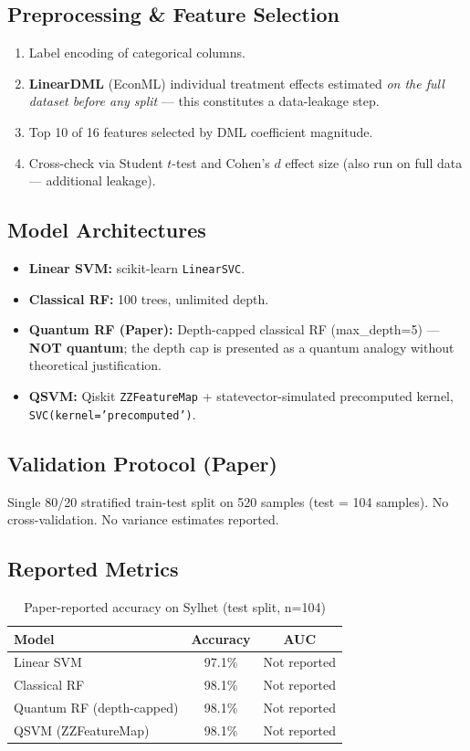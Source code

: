 \documentclass[12pt,a4paper]{article}
\begin{document}
\subsection{Preprocessing \& Feature Selection}
\begin{enumerate}[leftmargin=*]
  \item Label encoding of categorical columns.
  \item \textbf{LinearDML} (EconML) individual treatment effects estimated \emph{on the full dataset before any split} --- this constitutes a data-leakage step.
  \item Top 10 of 16 features selected by DML coefficient magnitude.
  \item Cross-check via Student $t$-test and Cohen's $d$ effect size (also run on full data --- additional leakage).
\end{enumerate}

\subsection{Model Architectures}
\begin{itemize}[leftmargin=*]
  \item \textbf{Linear SVM:} scikit-learn \texttt{LinearSVC}.
  \item \textbf{Classical RF:} 100 trees, unlimited depth.
  \item \textbf{Quantum RF (Paper):} Depth-capped classical RF (max\_depth=5) --- \textbf{NOT quantum}; the depth cap is presented as a quantum analogy without theoretical justification.
  \item \textbf{QSVM:} Qiskit \texttt{ZZFeatureMap} + statevector-simulated precomputed kernel, \texttt{SVC(kernel='precomputed')}.
\end{itemize}

\subsection{Validation Protocol (Paper)}
Single 80/20 stratified train-test split on 520 samples (test = 104 samples). No cross-validation. No variance estimates reported.

\subsection{Reported Metrics}
\begin{table}[h!]
  \centering
  \caption{Paper-reported accuracy on Sylhet (test split, n=104)}
  \begin{tabular}{lcc}
    \toprule
    \textbf{Model} & \textbf{Accuracy} & \textbf{AUC}\\
    \midrule
    Linear SVM & 97.1\% & Not reported\\
    Classical RF & 98.1\% & Not reported\\
    Quantum RF (depth-capped) & 98.1\% & Not reported\\
    QSVM (ZZFeatureMap) & 98.1\% & Not reported\\
    \bottomrule
  \end{tabular}
\end{table}
\end{document}
